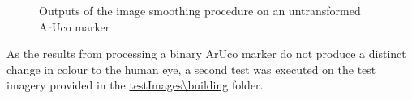 \documentclass[12pt, titlepage]{article}
\begin{document}
\begin{enumerate}
\begin{figure}[h!]
  \centering
  \hfill
  \caption{Outputs of the image smoothing procedure on an untransformed ArUco marker}
  \label{fig-IS-AR}
\end{figure}


As the results from processing a binary ArUco marker do not produce a distinct change in colour to the human eye, a second test was executed on the test imagery provided in the \href{https://github.com/KiranSingh15/CAS-741-Image-Correspondences/tree/main/src/tests/testImages/building}{testImages\textbackslash building} folder.


\end{enumerate}
\end{document}
